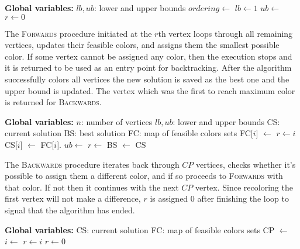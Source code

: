 \begin{algorithmic}[1]
 \Statex \textbf{Global variables:}
 \Statex $lb, ub$: lower and upper bounds
    \ls $ordering \gets$ 
    \ls $lb \gets 1$
    \ls $ub \gets$ 
    \ls $r \gets 0$
	\mWhile{\TRUE}
		\ls {}
            \ls \BREAK
        \mEndIf
        \ls {}
            \ls \BREAK
        \mEndIf
    \mEndWhile
	\mEndProcedure
\end{algorithmic}
\vspace{10pt}
The \textsc{Forwards} procedure initiated at the $r$th vertex loops through all remaining vertices, updates their feasible colors, and assigns them the smallest possible color. If some vertex cannot be assigned any color, then the execution stops and it is returned to be used as an entry point for backtracking. After the algorithm successfully colors all vertices the new solution is saved as the best one and the upper bound is updated. The vertex which was the first to reach maximum color is returned for \textsc{Backwards}.\vspace{10pt}
\begin{algorithmic}[1]
 \Statex \textbf{Global variables:}
 \Statex $n$: number of vertices
 \Statex $lb, ub$: lower and upper bounds
 \Statex CS: current solution
 \Statex BS: best solution
 \Statex FC: map of feasible colors sets
        \ls FC[$i$] $\gets$ 
            \ls $r \gets i$
            \ls \RETURN
        \mEndIf
        \ls CS[$i$] $\gets$ FC[$i$].
    \mEndFor
    \ls $ub \gets $ 
    \ls $r \gets $ 
    \ls BS $\gets$ CS
	\mEndProcedure
\end{algorithmic}
\vspace{10pt}
The \textsc{Backwards} procedure iterates back through $CP$ vertices, checks whether it's possible to assign them a different color, and if so proceeds to \textsc{Forwards} with that color. If not then it continues with the next $CP$ vertex. Since recoloring the first vertex will not make a difference, $r$ is assigned 0 after finishing the loop to signal that the algorithm has ended.
\vspace{10pt}
\begin{algorithmic}[1]
 \Statex \textbf{Global variables:}
 \Statex CS: current solution
 \Statex FC: map of feasible colors sets
        \ls CP $\gets$ 
            \ls $i \gets $ 
            \ls {}
                \ls $r \gets i$
                \ls \RETURN
            \mEndIf
        \mEndWhile
        \ls $r \gets 0$
	\mEndProcedure
\end{algorithmic}
